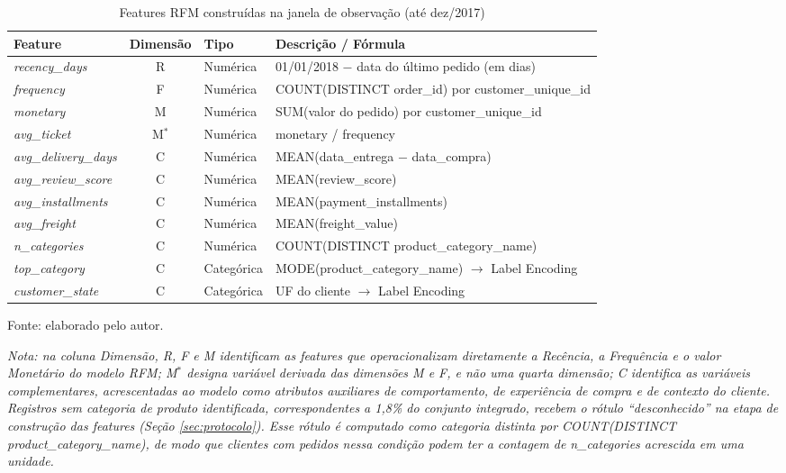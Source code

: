 \begin{table}[htbp]
\ABNTEXfontereduzida
\SingleSpacing
\caption{Features RFM construídas na janela de observação (até dez/2017)}
\label{tab:features-rfm}
\centering
\scriptsize
\setlength{\tabcolsep}{4pt}
\begin{tabular}{l c l l}
\hline
\textbf{Feature} & \textbf{Dimensão} & \textbf{Tipo} & \textbf{Descrição / Fórmula} \\
\hline
\textit{recency\_days}        & R & Numérica   & 01/01/2018 $-$ data do último pedido (em dias) \\
\textit{frequency}            & F & Numérica   & COUNT(DISTINCT order\_id) por customer\_unique\_id \\
\textit{monetary}             & M & Numérica   & SUM(valor do pedido) por customer\_unique\_id \\
\textit{avg\_ticket}          & M$^{*}$ & Numérica   & monetary / frequency \\
\textit{avg\_delivery\_days}  & C & Numérica   & MEAN(data\_entrega $-$ data\_compra) \\
\textit{avg\_review\_score}   & C & Numérica   & MEAN(review\_score) \\
\textit{avg\_installments}    & C & Numérica   & MEAN(payment\_installments) \\
\textit{avg\_freight}         & C & Numérica   & MEAN(freight\_value) \\
\textit{n\_categories}        & C & Numérica   & COUNT(DISTINCT product\_category\_name) \\
\textit{top\_category}        & C & Categórica & MODE(product\_category\_name) $\rightarrow$ Label Encoding \\
\textit{customer\_state}      & C & Categórica & UF do cliente $\rightarrow$ Label Encoding \\
\hline
\end{tabular}
\begin{flushleft}
	\ABNTEXfontereduzida
	\SingleSpacing
	Fonte: elaborado pelo autor.

	\textit{Nota: na coluna Dimensão, R, F e M identificam as features que operacionalizam diretamente a Recência, a Frequência e o valor Monetário do modelo RFM; M$^{*}$ designa variável derivada das dimensões M e F, e não uma quarta dimensão; C identifica as variáveis complementares, acrescentadas ao modelo como atributos auxiliares de comportamento, de experiência de compra e de contexto do cliente. Registros sem categoria de produto identificada, correspondentes a 1,8\% do conjunto integrado, recebem o rótulo ``desconhecido'' na etapa de construção das features (Seção \ref{sec:protocolo}). Esse rótulo é computado como categoria distinta por COUNT(DISTINCT product\_category\_name), de modo que clientes com pedidos nessa condição podem ter a contagem de n\_categories acrescida em uma unidade.}
\end{flushleft}
\end{table}

